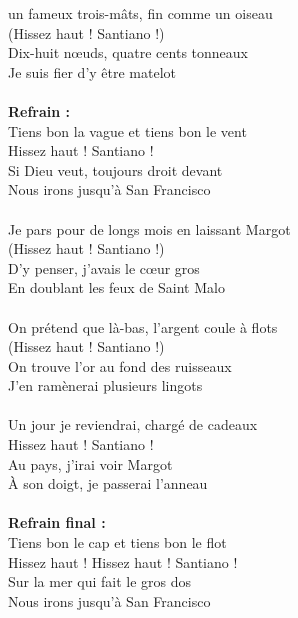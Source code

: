 
 un fameux trois-mâts, fin comme un oiseau
\\(Hissez haut ! Santiano !)
\\Dix-huit nœuds, quatre cents tonneaux
\\Je suis fier d'y être matelot
\\\\\textbf{Refrain :}
\\Tiens bon la vague et tiens bon le vent
\\Hissez haut ! Santiano !
\\Si Dieu veut, toujours droit devant
\\Nous irons jusqu'à San Francisco
\\\\Je pars pour de longs mois en laissant Margot
\\(Hissez haut ! Santiano !)
\\D'y penser, j'avais le cœur gros
\\En doublant les feux de Saint Malo
\\\\On prétend que là-bas, l'argent coule à flots
\\(Hissez haut ! Santiano !)
\\On trouve l'or au fond des ruisseaux
\\J'en ramènerai plusieurs lingots
\\\\Un jour je reviendrai, chargé de cadeaux
\\Hissez haut ! Santiano !
\\Au pays, j'irai voir Margot
\\À son doigt, je passerai l'anneau
\\\\\textbf{Refrain final :}
\\Tiens bon le cap et tiens bon le flot
\\Hissez haut ! Hissez haut ! Santiano !
\\Sur la mer qui fait le gros dos
\\Nous irons jusqu'à San Francisco


\breakpage